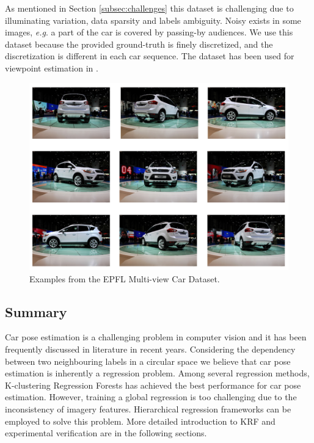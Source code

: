 \documentclass{tutmscthesis}[2010/09/22]
\numberwithin{equation}{section}
\numberwithin{table}{section}
\numberwithin{figure}{section}
\def\onedot{. }
\def\eg{\emph{e.g}\onedot} \def\Eg{\emph{E.g}\onedot}
\begin{document}
As mentioned in Section \ref{subsec:challenges} this dataset is challenging due to illuminating variation, data sparsity and labels ambiguity. 
Noisy exists in some images, \eg a part of the car is covered by passing-by audiences.
We use this dataset because the provided ground-truth is finely discretized, and the discretization is different in each car sequence. 
The dataset has been used for viewpoint estimation in \cite{ozuysal2009pose, torki2011regression, fenzi2013class, hara2014growing}.

\vspace{25mm}
\begin{figure}[t]
\centering
\includegraphics[width=0.98\linewidth]{example.png}
\caption{Examples from the EPFL Multi-view Car Dataset.}
\label{fig:example}
\end{figure}

\clearpage

\subsection{Summary}
Car pose estimation is a challenging problem in computer vision and it has been frequently discussed in literature in recent years. 
Considering the dependency between two neighbouring labels in a circular space we believe that car pose estimation is inherently a regression problem. 
Among several regression methods, K-clustering Regression Forests has achieved the best performance for car pose estimation.
However, training a global regression is too challenging due to the inconsistency of imagery features.
Hierarchical regression frameworks can be employed to solve this problem.
More detailed introduction to KRF and experimental verification are in the following sections.
\end{document}
